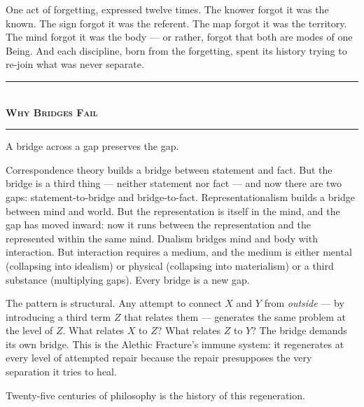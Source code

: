 \documentclass[10pt, openany, oneside]{book}
\renewcommand{\normalsize}{\fontsize{10}{13}\selectfont}
\begin{document}
One act of forgetting, expressed twelve times. The knower forgot it was the known. The sign forgot it was the referent. The map forgot it was the territory. The mind forgot it was the body --- or rather, forgot that both are modes of one Being. And each discipline, born from the forgetting, spent its history trying to re-join what was never separate.

\vspace{1.5em}


\begin{center}
    \rule{0.3\textwidth}{0.4pt}\\[0.5em]
    {\normalsize\bfseries\scshape Why Bridges Fail}\\[0.3em]
    \rule{0.3\textwidth}{0.4pt}
\end{center}

\vspace{1em}

\noindent A bridge across a gap preserves the gap.

Correspondence theory builds a bridge between statement and fact. But the bridge is a third thing --- neither statement nor fact --- and now there are two gaps: statement-to-bridge and bridge-to-fact. Representationalism builds a bridge between mind and world. But the representation is itself in the mind, and the gap has moved inward: now it runs between the representation and the represented within the same mind. Dualism bridges mind and body with interaction. But interaction requires a medium, and the medium is either mental (collapsing into idealism) or physical (collapsing into materialism) or a third substance (multiplying gaps). Every bridge is a new gap.

The pattern is structural. Any attempt to connect $X$ and $Y$ from \textit{outside} --- by introducing a third term $Z$ that relates them --- generates the same problem at the level of $Z$. What relates $X$ to $Z$? What relates $Z$ to $Y$? The bridge demands its own bridge. This is the Alethic Fracture's immune system: it regenerates at every level of attempted repair because the repair presupposes the very separation it tries to heal.

Twenty-five centuries of philosophy is the history of this regeneration.

\vspace{0.5em}
\end{document}
